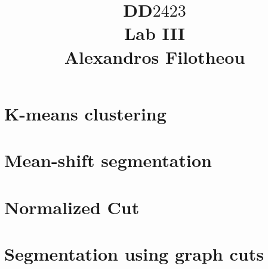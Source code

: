 \documentclass[oneside,12pt]{article}
\title{DD$2423$ \\ Lab III \\ Alexandros Filotheou}
\date{}
\begin{document}
	\maketitle

  \section{K-means clustering}
    
    \newpage

  \section{Mean-shift segmentation}
    
    \newpage

  \section{Normalized Cut}
    
    \newpage

  \section{Segmentation using graph cuts}
    
\end{document}

